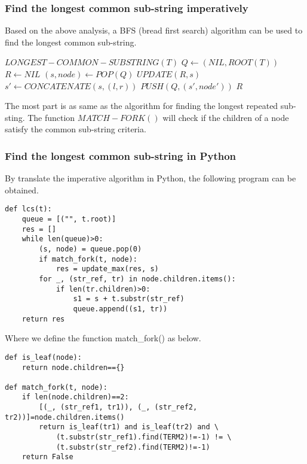 \documentclass{article}
\begin{document}
\subsubsection{Find the longest common sub-string imperatively}
Based on the above analysis, a BFS (bread first search) algorithm 
can be used to find the longest common sub-string.

\begin{algorithmic}
\STATE $LONGEST-COMMON-SUBSTRING(T)$
  \STATE $Q \leftarrow (NIL, ROOT(T))$
  \STATE $R \leftarrow NIL$
    \STATE $(s, node) \leftarrow POP(Q)$
      \STATE $UPDATE(R, s)$
    \ENDIF
        \STATE $s' \leftarrow CONCATENATE(s, (l, r))$
        \STATE $PUSH(Q, (s', node'))$
      \ENDIF
    \ENDFOR
  \ENDWHILE
  \RETURN $R$
\end{algorithmic}

The most part is as same as the algorithm for finding the longest repeated
sub-sting. The function $MATCH-FORK()$ will check if the children of a 
node satisfy the common sub-string criteria.

\subsubsection*{Find the longest common sub-string in Python}
By translate the imperative algorithm in Python, the following program can
be obtained.

\lstset{language=Python}
\begin{lstlisting}
def lcs(t):
    queue = [("", t.root)]
    res = []
    while len(queue)>0:
        (s, node) = queue.pop(0)
        if match_fork(t, node):
            res = update_max(res, s)
        for _, (str_ref, tr) in node.children.items():
            if len(tr.children)>0:
                s1 = s + t.substr(str_ref)
                queue.append((s1, tr))
    return res
\end{lstlisting}

Where we define the function match\_fork() as below.

\begin{lstlisting}
def is_leaf(node):
    return node.children=={}

def match_fork(t, node):
    if len(node.children)==2:
        [(_, (str_ref1, tr1)), (_, (str_ref2, tr2))]=node.children.items()
        return is_leaf(tr1) and is_leaf(tr2) and \
            (t.substr(str_ref1).find(TERM2)!=-1) != \
            (t.substr(str_ref2).find(TERM2)!=-1)
    return False
\end{lstlisting}
\end{document}
